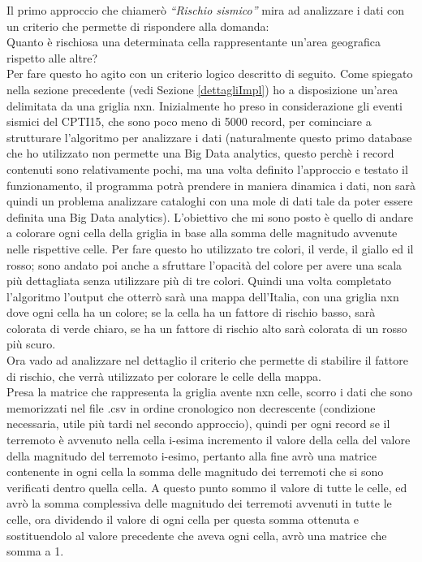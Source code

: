 Il primo approccio che chiamer\`o \textit{``Rischio sismico''} mira ad analizzare i dati con un criterio che permette di rispondere alla domanda:\\
Quanto \`e rischiosa una determinata cella rappresentante un'area geografica rispetto alle altre?\\
Per fare questo ho agito con un criterio logico descritto di seguito. Come spiegato nella sezione precedente (vedi Sezione \ref{dettagliImpl}) ho a disposizione un'area delimitata da una griglia nxn. Inizialmente ho preso in considerazione gli eventi sismici del CPTI15, che sono poco meno di 5000 record, per cominciare a strutturare l'algoritmo per analizzare i dati (naturalmente questo primo database che ho utilizzato non permette una Big Data analytics, questo perch\`e i record contenuti sono relativamente pochi, ma una volta definito l'approccio e testato il funzionamento, il programma potr\`a prendere in maniera dinamica i dati, non sar\`a quindi un problema analizzare cataloghi con una mole di dati tale da poter essere definita una Big Data analytics). L'obiettivo che mi sono posto \`e quello di andare a colorare ogni cella della griglia in base alla somma delle magnitudo avvenute nelle rispettive celle. Per fare questo ho utilizzato tre colori, il verde, il giallo ed il rosso; sono andato poi anche a sfruttare l'opacit\`a del colore per avere una scala pi\`u dettagliata senza utilizzare pi\`u di tre colori. Quindi una volta completato l'algoritmo l'output che otterr\`o sar\`a una mappa dell'Italia, con una griglia nxn dove ogni cella ha un colore; se la cella ha un fattore di rischio basso, sar\`a colorata di verde chiaro, se ha un fattore di rischio alto sar\`a colorata di un rosso pi\`u scuro.\\
Ora vado ad analizzare nel dettaglio il criterio che permette di stabilire il fattore di rischio, che verr\`a utilizzato per colorare le celle della mappa.\\
Presa la matrice che rappresenta la griglia avente nxn celle, scorro i dati che sono memorizzati nel file .csv in ordine cronologico non decrescente (condizione necessaria, utile pi\`u tardi nel secondo approccio), quindi per ogni record se il terremoto \`e avvenuto nella cella i-esima incremento il valore della cella del valore della magnitudo del terremoto i-esimo, pertanto alla fine avr\`o una matrice contenente in ogni cella la somma delle magnitudo dei terremoti che si sono verificati dentro quella cella. A questo punto sommo il valore di tutte le celle, ed avr\`o la somma complessiva delle magnitudo dei terremoti avvenuti in tutte le celle, ora dividendo il valore di ogni cella per questa somma ottenuta e sostituendolo al valore precedente che aveva ogni cella, avr\`o una matrice che somma a 1.\\
